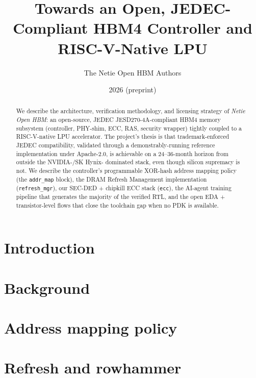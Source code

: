\documentclass[11pt,a4paper]{article}
\title{Towards an Open, JEDEC-Compliant HBM4 Controller and RISC-V-Native LPU}
\author{The Netie Open HBM Authors}
\date{2026 (preprint)}
\begin{document}
\maketitle

\begin{abstract}
We describe the architecture, verification methodology, and licensing
strategy of \emph{Netie Open HBM}: an open-source, JEDEC JESD270-4A-compliant
HBM4 memory subsystem (controller, PHY-shim, ECC, RAS, security wrapper)
tightly coupled to a RISC-V-native LPU accelerator. The project's thesis
is that trademark-enforced JEDEC compatibility, validated through a
demonstrably-running reference implementation under Apache-2.0, is
achievable on a 24--36-month horizon from outside the NVIDIA-/SK Hynix-
dominated stack, even though silicon supremacy is not. We describe the
controller's programmable XOR-hash address mapping policy (the
\texttt{addr\_map} block), the DRAM Refresh Management implementation
(\texttt{refresh\_mgr}), our SEC-DED + chipkill ECC stack
(\texttt{ecc}), the AI-agent training pipeline that generates the
majority of the verified RTL, and the open EDA + transistor-level
flows that close the toolchain gap when no PDK is available.
\end{abstract}

\section{Introduction}
\label{sec:intro}


\section{Background}
\label{sec:bg}


\section{Address mapping policy}
\label{sec:addr_map}


\section{Refresh and rowhammer}
\label{sec:refresh}

\end{document}

